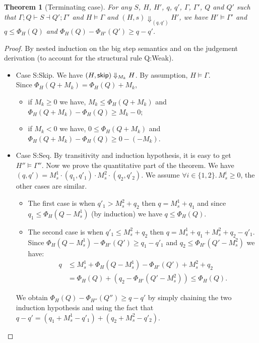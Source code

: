 \documentclass[nocopyrightspace,preprint]{sigplanconf}
\newtheorem{theorem}{Theorem}
\begin{document}
\begin{theorem}[Terminating case]
For any $S$, $H$, $H'$, $q$, $q'$, $\Gamma$, $\Gamma'$, $Q$ and $Q'$ such
that $\Gamma; Q \vdash S \dashv Q'; \Gamma'$ and $H \models \Gamma$ and
$(H,s) \Downarrow_{(q,q')} H'$, we have
$H' \models \Gamma'$ and
$q \le \Phi_H(Q)$ and
$\Phi_H(Q) - \Phi_{H'}(Q') \ge q - q'$.
\end{theorem}

\begin{proof} By nested induction on the big step semantics and on the
judgement derivation (to account for the structural rule {\sc Q:Weak}).

\begin{itemize}

\item Case {\sc S:Skip}.
  We have $(H, \mathsf{skip}) \Downarrow_{M_k} H$.
  By assumption, $H \models \Gamma$. \\
  Since $\Phi_H(Q + M_k) = \Phi_H(Q) + M_k$,
  \begin{itemize}[topsep=0pt]
  \item
    if $M_k \ge 0$ we have,
      $M_k \le \Phi_H(Q + M_k)$ and
      $\Phi_H(Q + M_k) - \Phi_H(Q) \ge M_k - 0$;
  \item
    if $M_k < 0$ we have,
      $0 \le \Phi_H(Q + M_k)$ and
      $\Phi_H(Q + M_k) - \Phi_H(Q) \ge 0 - (-M_k)$.
  \end{itemize}

\item Case {\sc S:Seq}.
  By transitivity and induction hypothesis, it is
  easy to get $H'' \models \Gamma''$.  Now we prove
  the quantitative part of the theorem.  We have
  $(q, q') = M_s^1 \cdot (q_1, q'_1) \cdot M_s^2 \cdot (q_2, q'_2)$.
  We assume $\forall i \in \{1, 2\}.\, M_s^i \ge 0$, the other cases
  are similar.
  \begin{itemize}[topsep=0pt]
  \item
    The first case is when $q'_1 > M_s^2 + q_2$ then $q = M_s^1 + q_1$
    and since $q_1 \le \Phi_H(Q - M_s^1)$ (by induction) we have
    $q \le \Phi_H(Q)$.
  \item
    The second case is when $q'_1 \le M_s^2 + q_2$ then $q = M_s^1 + q_1 + M_s^2 + q_2 - q'_1$. \\
    Since $\Phi_H(Q - M_s^1) - \Phi_{H'}(Q') \ge q_1 - q'_1$
    and $q_2 \le \Phi_{H'}(Q' - M_s^2)$ we have:
    \begin{align*}
    q &\le M_s^1 + \Phi_H(Q - M_s^1) - \Phi_{H'}(Q') + M_s^2 + q_2 \\
      &= \Phi_H(Q) + (q_2 - \Phi_{H'}(Q' - M_s^2)) \le \Phi_H(Q).
   \end{align*}
  \end{itemize}
  We obtain $\Phi_H(Q) - \Phi_{H''}(Q'') \ge q - q'$ by simply chaining
  the two induction hypothesis and using the fact that $q - q' =
  (q_1 + M_s^1 - q'_1) + (q_2 + M_s^2 - q'_2)$.


\end{itemize}
\end{proof}
\end{document}

